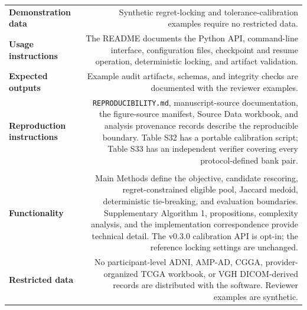 \documentclass[10pt,letterpaper]{article}
\newcommand{\topic}[1]{\sffamily\bfseries\color{TextGray}#1}
\begin{document}
\begin{tabular}{@{}LR@{}}
\topic{Demonstration data} & Synthetic regret-locking and tolerance-calibration examples require no restricted data.\\
\topic{Usage instructions} & The README documents the Python API, command-line interface, configuration files, checkpoint and resume operation, deterministic locking, and artifact validation.\\
\topic{Expected outputs} & Example audit artifacts, schemas, and integrity checks are documented with the reviewer examples.\\
\topic{Reproduction instructions} & \texttt{REPRODUCIBILITY.md}, manuscript-source documentation, the figure-source manifest, Source Data workbook, and analysis provenance records describe the reproducible boundary. Table S32 has a portable calibration script; Table S33 has an independent verifier covering every protocol-defined bank pair.\\
\midrule
{}\\
\topic{Functionality} & Main Methods define the objective, candidate rescoring, regret-constrained eligible pool, Jaccard medoid, deterministic tie-breaking, and evaluation boundaries. Supplementary Algorithm 1, propositions, complexity analysis, and the implementation correspondence provide technical detail. The v0.3.0 calibration API is opt-in; the reference locking settings are unchanged.\\
\topic{Restricted data} & No participant-level ADNI, AMP-AD, CGGA, provider-organized TCGA workbook, or VGH DICOM-derived records are distributed with the software. Reviewer examples are synthetic.\\
\bottomrule
\end{tabular}
\end{document}
